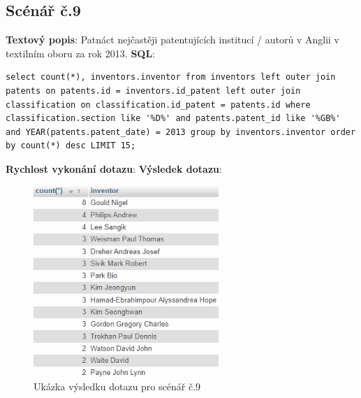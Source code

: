 \subsection{Scénář č.9}
\textbf{Textový popis}: Patnáct nejčastěji patentujících institucí / autorů v Anglii v textilním oboru za rok 2013.
\newline
\textbf{SQL}: 
\begin{lstlisting}[label = {lst:elements_a}]
select count(*), inventors.inventor from inventors left outer join patents on patents.id = inventors.id_patent left outer join classification on classification.id_patent = patents.id where classification.section like '%D%' and patents.patent_id like '%GB%' and YEAR(patents.patent_date) = 2013 group by inventors.inventor order by count(*) desc LIMIT 15;
\end{lstlisting}
\textbf{Rychlost vykonání dotazu}: 
\newline
\textbf{Výsledek dotazu}:
\begin{figure}[H]
\centering
\includegraphics[width=7cm]{img/scenare/scenar_9}
\caption{Ukázka výsledku dotazu pro scénář č.9}
\label{fig:scenar9}
\end{figure}